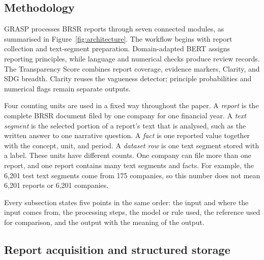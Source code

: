  
\begin{lrbox}{\methodologyoverviewbox}
\begin{minipage}{\linewidth}
\section{Methodology}
\label{sec:methodology}

GRASP processes BRSR reports through seven connected modules, as summarised in Figure~\ref{fig:architecture}. The workflow begins with report collection and text-segment preparation. Domain-adapted BERT assigns reporting principles, while language and numerical checks produce review records. The Transparency Score combines report coverage, evidence markers, Clarity, and SDG breadth. Clarity reuses the vagueness detector; principle probabilities and numerical flags remain separate outputs.


\end{minipage}
\end{lrbox}
\ifdim\dimexpr\ht\methodologyoverviewbox+\dp\methodologyoverviewbox\relax>\textheight
\PackageError{GRASP-layout}{Methodology overview exceeds one page}{Reduce the diagram height.}
\fi
\noindent\usebox{\methodologyoverviewbox}
\par\clearpage

Four counting units are used in a fixed way throughout the paper. A \emph{report} is the complete BRSR document filed by one company for one financial year. A \emph{text segment} is the selected portion of a report's text that is analysed, such as the written answer to one narrative question. A \emph{fact} is one reported value together with the concept, unit, and period. A \emph{dataset row} is one text segment stored with a label. These units have different counts. One company can file more than one report, and one report contains many text segments and facts. For example, the 6,201 test text segments come from 175 companies, so this number does not mean 6,201 reports or 6,201 companies.

Every subsection states five points in the same order: the input and where the input comes from, the processing steps, the model or rule used, the reference used for comparison, and the output with the meaning of the output.

\subsection{Report acquisition and structured storage}
\label{sec:ingestion}

